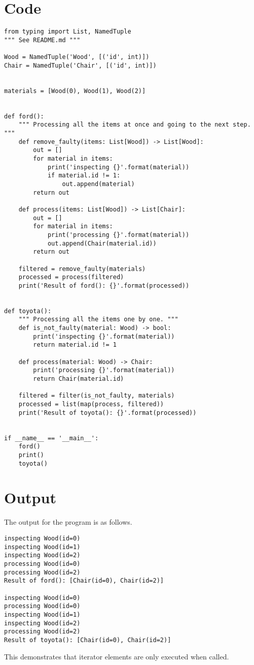 \section{Code}
\label{sec:code}
\begin{verbatim}
from typing import List, NamedTuple
""" See README.md """

Wood = NamedTuple('Wood', [('id', int)])
Chair = NamedTuple('Chair', [('id', int)])


materials = [Wood(0), Wood(1), Wood(2)]


def ford():
    """ Processing all the items at once and going to the next step. """
    def remove_faulty(items: List[Wood]) -> List[Wood]:
        out = []
        for material in items:
            print('inspecting {}'.format(material))
            if material.id != 1:
                out.append(material)
        return out

    def process(items: List[Wood]) -> List[Chair]:
        out = []
        for material in items:
            print('processing {}'.format(material))
            out.append(Chair(material.id))
        return out

    filtered = remove_faulty(materials)
    processed = process(filtered)
    print('Result of ford(): {}'.format(processed))


def toyota():
    """ Processing all the items one by one. """
    def is_not_faulty(material: Wood) -> bool:
        print('inspecting {}'.format(material))
        return material.id != 1

    def process(material: Wood) -> Chair:
        print('processing {}'.format(material))
        return Chair(material.id)

    filtered = filter(is_not_faulty, materials)
    processed = list(map(process, filtered))
    print('Result of toyota(): {}'.format(processed))


if __name__ == '__main__':
    ford()
    print()
    toyota()
\end{verbatim}

\section{Output}
\label{sec:output}
The output for the program is as follows.

\begin{verbatim}
inspecting Wood(id=0)
inspecting Wood(id=1)
inspecting Wood(id=2)
processing Wood(id=0)
processing Wood(id=2)
Result of ford(): [Chair(id=0), Chair(id=2)]

inspecting Wood(id=0)
processing Wood(id=0)
inspecting Wood(id=1)
inspecting Wood(id=2)
processing Wood(id=2)
Result of toyota(): [Chair(id=0), Chair(id=2)]
\end{verbatim}

This demonstrates that iterator elements are only executed when called.
